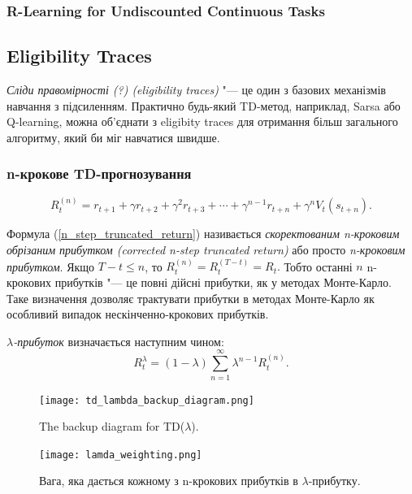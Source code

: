 \subsubsection{R-Learning for Undiscounted Continuous Tasks}

\subsection{Eligibility Traces}

\emph{Сліди правомірності (?) (eligibility traces)} "--- це один з базових механізмів навчання з підсиленням. Практично будь-який TD-метод, наприклад, Sarsa або Q-learning, можна об'єднати з eligibity traces для отримання більш загального алгоритму, який би міг навчатися швидше.

\subsubsection{n-крокове TD-прогнозування}

\begin{equation}
\label{n_step_truncated_return}
R_t^{(n)} = r_{t+1} + \gamma r_{t+2} + \gamma^2 r_{t+3} + \cdots + \gamma^{n-1} r_{t+n} + \gamma^n V_t(s_{t+n}).
\end{equation}

Формула (\ref{n_step_truncated_return}) називається \emph{скоректованим n-кроковим обрізаним прибутком (corrected n-step truncated return)} або просто \emph{n-кроковим прибутком}.
Якщо $T-t\leq n$, то $R_t^{(n)} = R_t^{(T-t)}=R_t.$ Тобто останні $n$ n-крокових прибутків "--- це повні дійсні прибутки, як у методах Монте-Карло. Таке визначення дозволяє трактувати прибутки в методах Монте-Карло як особливий випадок нескінченно-крокових прибутків.

\emph{$\lambda$-прибуток} визначається наступним чином:
\begin{equation}
R_t^\lambda = (1-\lambda)\sum_{n=1}^\infty \lambda^{n-1} R_t^{(n)}.
\end{equation}

\begin{figure}
\centering
\texttt{[image: td\_lambda\_backup\_diagram.png]}
\label{TD_lamda_backup_diagram}
\caption{The backup diagram for TD($\lambda$).}
\end{figure}

\begin{figure}
\centering
\texttt{[image: lamda\_weighting.png]}
\label{lamda_weighting}
\caption{Вага, яка дається кожному з n-крокових прибутків в $\lambda$-прибутку.}
\end{figure}

